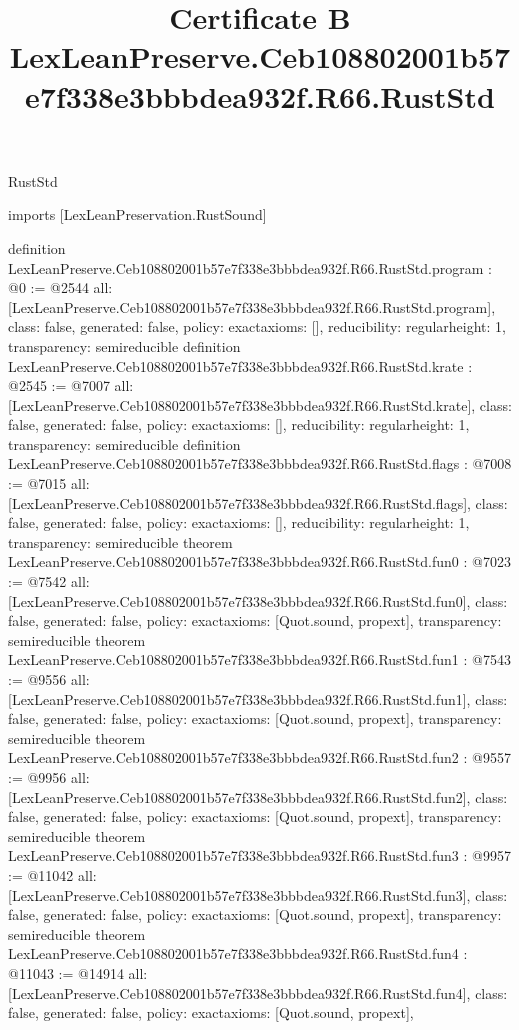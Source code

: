 \begin{lexlean}{RustStd}
\title{Certificate B LexLeanPreserve.Ceb108802001b57e7f338e3bbbdea932f.R66.RustStd}
\begin{coremodule}
imports [LexLeanPreservation.RustSound]

definition LexLeanPreserve.Ceb108802001b57e7f338e3bbbdea932f.R66.RustStd.program : @0 := @2544 {
  all: [LexLeanPreserve.Ceb108802001b57e7f338e3bbbdea932f.R66.RustStd.program],
  class: false,
  generated: false,
  policy: exact{axioms: []},
  reducibility: regular{height: 1},
  transparency: semireducible
}
definition LexLeanPreserve.Ceb108802001b57e7f338e3bbbdea932f.R66.RustStd.krate : @2545 := @7007 {
  all: [LexLeanPreserve.Ceb108802001b57e7f338e3bbbdea932f.R66.RustStd.krate],
  class: false,
  generated: false,
  policy: exact{axioms: []},
  reducibility: regular{height: 1},
  transparency: semireducible
}
definition LexLeanPreserve.Ceb108802001b57e7f338e3bbbdea932f.R66.RustStd.flags : @7008 := @7015 {
  all: [LexLeanPreserve.Ceb108802001b57e7f338e3bbbdea932f.R66.RustStd.flags],
  class: false,
  generated: false,
  policy: exact{axioms: []},
  reducibility: regular{height: 1},
  transparency: semireducible
}
theorem LexLeanPreserve.Ceb108802001b57e7f338e3bbbdea932f.R66.RustStd.fun0 : @7023 := @7542 {
  all: [LexLeanPreserve.Ceb108802001b57e7f338e3bbbdea932f.R66.RustStd.fun0],
  class: false,
  generated: false,
  policy: exact{axioms: [Quot.sound, propext]},
  transparency: semireducible
}
theorem LexLeanPreserve.Ceb108802001b57e7f338e3bbbdea932f.R66.RustStd.fun1 : @7543 := @9556 {
  all: [LexLeanPreserve.Ceb108802001b57e7f338e3bbbdea932f.R66.RustStd.fun1],
  class: false,
  generated: false,
  policy: exact{axioms: [Quot.sound, propext]},
  transparency: semireducible
}
theorem LexLeanPreserve.Ceb108802001b57e7f338e3bbbdea932f.R66.RustStd.fun2 : @9557 := @9956 {
  all: [LexLeanPreserve.Ceb108802001b57e7f338e3bbbdea932f.R66.RustStd.fun2],
  class: false,
  generated: false,
  policy: exact{axioms: [Quot.sound, propext]},
  transparency: semireducible
}
theorem LexLeanPreserve.Ceb108802001b57e7f338e3bbbdea932f.R66.RustStd.fun3 : @9957 := @11042 {
  all: [LexLeanPreserve.Ceb108802001b57e7f338e3bbbdea932f.R66.RustStd.fun3],
  class: false,
  generated: false,
  policy: exact{axioms: [Quot.sound, propext]},
  transparency: semireducible
}
theorem LexLeanPreserve.Ceb108802001b57e7f338e3bbbdea932f.R66.RustStd.fun4 : @11043 := @14914 {
  all: [LexLeanPreserve.Ceb108802001b57e7f338e3bbbdea932f.R66.RustStd.fun4],
  class: false,
  generated: false,
  policy: exact{axioms: [Quot.sound, propext]},
}
\end{coremodule}
\end{lexlean}
